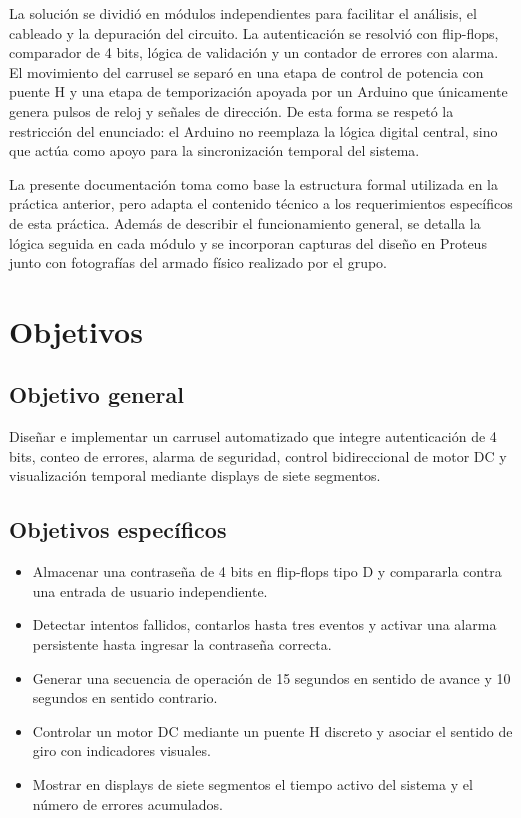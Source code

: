 \documentclass[12pt,a4paper]{article}
\begin{document}
La solución se dividió en módulos independientes para facilitar el análisis, el cableado y la depuración del circuito. La autenticación se resolvió con flip-flops, comparador de 4 bits, lógica de validación y un contador de errores con alarma. El movimiento del carrusel se separó en una etapa de control de potencia con puente H y una etapa de temporización apoyada por un Arduino que únicamente genera pulsos de reloj y señales de dirección. De esta forma se respetó la restricción del enunciado: el Arduino no reemplaza la lógica digital central, sino que actúa como apoyo para la sincronización temporal del sistema.

La presente documentación toma como base la estructura formal utilizada en la práctica anterior, pero adapta el contenido técnico a los requerimientos específicos de esta práctica. Además de describir el funcionamiento general, se detalla la lógica seguida en cada módulo y se incorporan capturas del diseño en Proteus junto con fotografías del armado físico realizado por el grupo.

\section{Objetivos}

\subsection{Objetivo general}
Diseñar e implementar un carrusel automatizado que integre autenticación de 4 bits, conteo de errores, alarma de seguridad, control bidireccional de motor DC y visualización temporal mediante displays de siete segmentos.

\subsection{Objetivos específicos}
\begin{itemize}[leftmargin=1.2cm]
    \item Almacenar una contraseña de 4 bits en flip-flops tipo D y compararla contra una entrada de usuario independiente.
    \item Detectar intentos fallidos, contarlos hasta tres eventos y activar una alarma persistente hasta ingresar la contraseña correcta.
    \item Generar una secuencia de operación de 15 segundos en sentido de avance y 10 segundos en sentido contrario.
    \item Controlar un motor DC mediante un puente H discreto y asociar el sentido de giro con indicadores visuales.
    \item Mostrar en displays de siete segmentos el tiempo activo del sistema y el número de errores acumulados.
\end{itemize}
\end{document}
